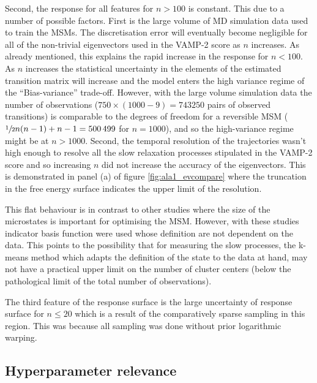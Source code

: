 Second, the response for all features for $n > 100$ is constant. This due to a number of possible factors. First is the large volume of MD simulation data used to train the MSMs. The discretisation error will eventually become negligible for all of the  non-trivial eigenvectors used in the VAMP-2 score as $n$ increases. As already mentioned, this explains the rapid increase in the response for $n<100$. As $n$ increases the statistical uncertainty in the elements of the estimated transition matrix will increase and the model enters the high variance regime of the ``Bias-variance'' trade-off.  However, with the large volume simulation data the number of observations ($750\times(1000-9) = \num{743250}$ pairs of observed transitions) is comparable to the degrees of freedom for a reversible MSM ($\sfrac{1}{2}n(n-1)+n-1=\num{500499}$ for $n=1000$), and so the high-variance regime might be at $n>1000$. Second, the temporal resolution of the trajectories wasn't high enough to resolve all the slow relaxation processes stipulated in the VAMP-2 score and so increasing $n$ did not increase the accuracy of the eigenvectors.  This is demonstrated in panel (a) of figure \ref{fig:ala1_evcompare} where the truncation in the free energy surface indicates the upper limit of the resolution. 

This flat behaviour is in contrast to other studies \cite{mcgibbonVariationalCrossvalidationSlow2015,wuVariationalApproachLearning2020c,prinzMarkovModelsMolecular2011} where the size of the microstates is important for optimising the MSM. However, with these studies indicator basis function were used whose definition are not dependent on the data. This points to the possibility that for measuring the slow processes, the k-means method which adapts the definition of the state to the data at hand, may not have a practical upper limit on the number of cluster centers (below the pathological limit of the total number of observations). 

The third feature of the response surface is the large uncertainty of response surface for $n \leq 20$ which is a result of the comparatively sparse sampling in this region. This was because all sampling was done without prior logarithmic warping. 
 
\subsection{Hyperparameter relevance}\label{subsubsec:ala_relevance}


